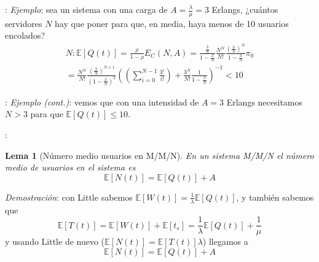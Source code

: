 \documentclass[xcolor={x11names}]{beamer}
\newtheorem{lema}{Lema}[section]
\begin{document}
\begin{frame}{\secname: \subsecname}
    \textit{Ejemplo}: sea un sistema con una
    carga de $A=\tfrac{\lambda}{\mu}=3$
    Erlangs, ¿cuántos servidores $N$ hay
    que poner para que, en media,
    haya menos de 10
    usuarios encolados?
    \begin{multline*}
        N:\mathbb{E}[Q(t)]=
        \frac{\rho}{1-\rho}E_C(N,A)
        = \frac{\tfrac{3}{N}}{1-\tfrac{3}{N}}
        \frac{N^N}{N!}\frac{\left(\frac{3}{N}\right)^N}{1-\tfrac{3}{N}}\pi_0\\
        =\frac{N^N}{N!}\frac{\left(\frac{3}{N}\right)^{N+1}}{\left(1-\tfrac{3}{N}\right)^2}
                \left(
                    \left(\sum_{i=0}^{N-1}
                    \frac{3^i}{i!}
                    \right)
                    + \frac{3^N}{N!}\frac{1}{1-\tfrac{3}{N}}
                \right)^{-1}<10
    \end{multline*}
\end{frame}





\begin{frame}{\secname: \subsecname}
    \textit{Ejemplo (cont.)}: vemos que con
    una intensidad de $A=3$ Erlangs necesitamos
    $N>3$ para que $\mathbb{E}[Q(t)]\leq 10$.
    \vfill
    \begin{figure}
        
    \end{figure}
\end{frame}





\begin{frame}{\secname: \subsecname}
    \begin{lema}[Número medio usuarios en M/M/N]
        En un sistema M/M/N el número medio
        de usuarios en el sistema es
        \begin{equation}
            \mathbb{E}[N(t)]=
            \mathbb{E}[Q(t)]+A
        \end{equation}
    \end{lema}
    \vfill
    \textit{Demostración}:
    con Little sabemos
    $\mathbb{E}[W(t)]=\tfrac{1}{\lambda}
    \mathbb{E}[Q(t)]$, y también sabemos que
    \begin{equation*}
        \mathbb{E}[T(t)]
        =\mathbb{E}[W(t)]+\mathbb{E}[t_s]
        = \frac{1}{\lambda}\mathbb{E}[Q(t)]
        + \frac{1}{\mu}
    \end{equation*}
    y usando Little de nuevo
    ($\mathbb{E}[N(t)]=\mathbb{E}[T(t)]\lambda$)
    llegamos a
    \begin{equation*}
        \mathbb{E}[N(t)]=
        \mathbb{E}[Q(t)]+A
    \end{equation*}
\end{frame}
\end{document}
